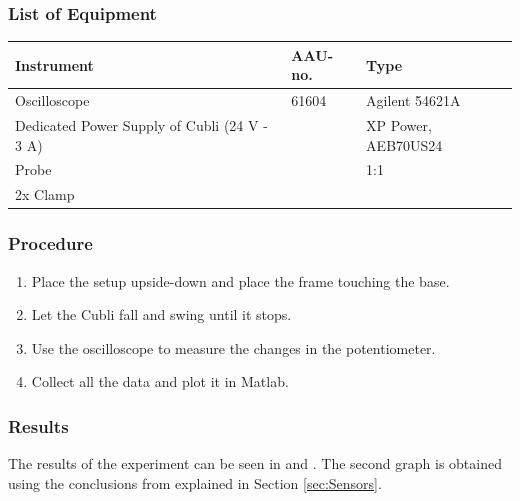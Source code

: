 \subsubsection{List of Equipment}
\begin{table}[H]
	\begin{tabular}{|l|l|p{4.3cm}|}
		\hline%
		\textbf{Instrument}                        &  \textbf{AAU-no.}  &  \textbf{Type}       \\
		\hline%
		Oscilloscope                              &  61604             &  Agilent 54621A		  \\
		\hline%
		Dedicated Power Supply of Cubli \small{(24 V - 3 A)} &               &  XP Power, AEB70US24 \\
		\hline%
		Probe               &             		&          1:1  \\
		\hline%
		2x Clamp                &  			            &          							   \\
		\hline%
	\end{tabular}
\end{table}

\subsubsection{Procedure}
\begin{enumerate}
	\item Place the setup upside-down and place the frame touching the base.
	\item Let the Cubli fall and swing until it stops.
	\item Use the oscilloscope to measure the changes in the potentiometer.
	\item Collect all the data and plot it in Matlab.	
\end{enumerate}

\subsubsection{Results}
The results of the experiment can be seen in  and . The second graph is obtained using the conclusions from  explained in Section \ref{sec:Sensors}.


